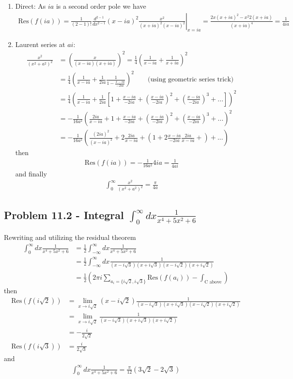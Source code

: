 \documentclass[../main.tex]{subfiles}
\begin{document}
\begin{enumerate}
\item Direct: As $ia$ is a second order pole we have
\begin{align}
\text{Res}(f(ia))
=\frac{1}{(2-1)!}\left.\frac{d^{2-1}}{dx^{2-1}}(x-ia)^2\frac{x^2}{(x+ia)^2(x-ia)^2}\right|_{x=ia}
=\frac{2x(x+ia)^2-x^2 2(x+ia)}{(x+ia)^4}=\frac{1}{4ia}
\end{align}
\item Laurent series at $ai$:
\begin{align}
\frac{x^2}{(x^2+a^2)^2}
&=\left(\frac{x}{(x-ia)(x+ia)}\right)^2
=\frac{1}{4}\left(\frac{1}{x-ia}+\frac{1}{x+ia}\right)^2\\
&=\frac{1}{4}\left(\frac{1}{x-ia}+\frac{1}{2ia}\frac{1}{1-\frac{x-ia}{-2ia}}\right)^2\qquad\text{(using geometric series trick)}\\
&=\frac{1}{4}\left(\frac{1}{x-ia}+\frac{1}{2ia}\left[1+\frac{x-ia}{-2ia}+\left(\frac{x-ia}{-2ia}\right)^2+\left(\frac{x-ia}{-2ia}\right)^3+...\right]\right)^2\\
&=-\frac{1}{16a^2}\left(\frac{2ia}{x-ia}+1+\frac{x-ia}{-2ia}+\left(\frac{x-ia}{-2ia}\right)^2+\left(\frac{x-ia}{-2ia}\right)^3+...\right)^2\\
&=-\frac{1}{16a^2}\left(\frac{(2ia)^2}{(x-ia)^2}+2\frac{2ia}{x-ia}+\left(1+2\frac{x-ia}{-2ia}\frac{2ia}{x-ia}+\right)+...\right)
\end{align}
then 
\begin{align}
\text{Res}(f(ia))=-\frac{1}{16a^2}4ia=\frac{1}{4ai}
\end{align}
and finally
\begin{align}
\int_0^\infty\frac{x^2}{(x^2+a^2)^2}=\frac{\pi}{4a}
\end{align}
\end{enumerate}

\subsection{Problem 11.2 - Integral $\int_0^\infty dx \frac{1}{x^4+5x^2+6}$}
Rewriting and utilizing the residual theorem
\begin{align}
\int_0^\infty dx\frac{1}{x^4+5x^2+6}
&=\frac{1}{2}\int_{-\infty}^\infty dx\frac{1}{x^4+5x^2+6}\\
&=\frac{1}{2}\int_{-\infty}^\infty dx\frac{1}{(x-i\sqrt{3})(x+i\sqrt{3})(x-i\sqrt{2})(x+i\sqrt{2})}\\
&=\frac{1}{2}\left(2\pi i\sum_{a_i=\{i\sqrt{2},i\sqrt{3}\}}\text{Res}(f(a_i))-\int_\text{C above}\right)
\end{align}
then
\begin{align}
\text{Res}(f(i\sqrt{2}))
&=\lim_{x\rightarrow i\sqrt{2}}(x-i\sqrt{2})\frac{1}{(x-i\sqrt{3})(x+i\sqrt{3})(x-i\sqrt{2})(x+i\sqrt{2})}\\
&=\lim_{x\rightarrow i\sqrt{2}}\frac{1}{(x-i\sqrt{3})(x+i\sqrt{3})(x+i\sqrt{2})}\\
&=-\frac{i}{2\sqrt{2}}\\
\text{Res}(f(i\sqrt{3}))
&=\frac{i}{2\sqrt{3}}
\end{align}
and
\begin{align}
\int_0^\infty dx\frac{1}{x^4+5x^2+6}=\frac{\pi}{12}(3\sqrt{2}-2\sqrt{3})
\end{align}
\end{document}
